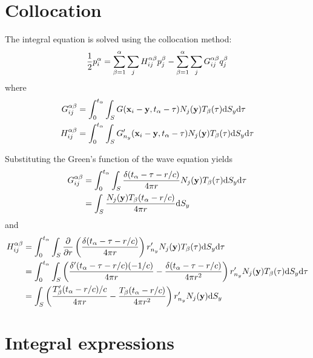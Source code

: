 \documentclass[a4paper,11pt,twoside]{article}
\newcommand{\td}{\mathrm{d}}
\begin{document}
\section{Collocation}

The integral equation is solved using the collocation method:
%
\begin{equation}
\frac{1}{2}p_{i}^{\alpha} =
\sum_{\beta = 1}^{\alpha} \sum_j 
H_{ij}^{\alpha \beta}
p^{\beta}_{j} \\
-
\sum_{\beta = 1}^{\alpha} \sum_j 
G_{ij}^{\alpha \beta}
q^{\beta}_{j} 
\end{equation}
%
where
%
\begin{align}
G_{ij}^{\alpha \beta} &=
\int_{0}^{t_{\alpha}} \int_{S}
G({\bf x}_i-{\bf y}, t_{\alpha}-\tau)
N_j({\bf y}) T_{\beta}(\tau)
\td S_{y} \td \tau
\nonumber \\
H_{ij}^{\alpha \beta} &=
\int_{0}^{t_{\alpha}} \int_{S}
G'_{n_y}({\bf x}_i-{\bf y}, t_{\alpha}-\tau)
N_j({\bf y}) T_{\beta}(\tau)
\td S_{y} \td \tau
\end{align}

Substituting the Green's function of the wave equation yields
%
\begin{align}
G_{ij}^{\alpha \beta}
&=
\int_{0}^{t_{\alpha}} \int_{S}
\frac{\delta(t_{\alpha}-\tau-r/c)}{4\pi r}
N_j({\bf y}) T_{\beta}(\tau)
\td S_{y} \td \tau
\nonumber \\
&=
\int_{S}
\frac{N_j({\bf y}) T_{\beta}(t_{\alpha}-r/c)}{4\pi r}
\td S_{y}
\end{align}
%
and
%
\begin{align}
H_{ij}^{\alpha \beta}
&=
\int_{0}^{t_{\alpha}} \int_{S}
\frac{\partial}{\partial r}\left(\frac{\delta(t_{\alpha}-\tau-r/c)}{4\pi r}\right)
r'_{n_{y}} N_j({\bf y}) T_{\beta}(\tau)
\td S_{y} \td \tau
\nonumber \\
&=
\int_{0}^{t_{\alpha}} \int_{S}
\left(
\frac{\delta'(t_{\alpha}-\tau-r/c)(-1/c)}{4\pi r}
-
\frac{\delta(t_{\alpha}-\tau-r/c)}{4\pi r^2}
\right)
r'_{n_{y}} N_j({\bf y}) T_{\beta}(\tau)
\td S_{y} \td \tau
\nonumber \\
&=
\int_{S}
\left(
\frac{T'_{\beta}(t_{\alpha}-r/c)/c}{4\pi r}
-
\frac{T_{\beta}(t_{\alpha}-r/c)}{4\pi r^2}
\right)
r'_{n_{y}} N_j({\bf y})
\td S_{y}
\end{align}
%

\section{Integral expressions}
\end{document}
